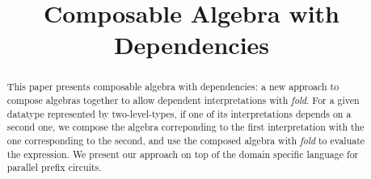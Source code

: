 \documentclass[nocopyrightspace]{sigplanconf}
\begin{document}
\setlength{\pdfpageheight}{\paperheight}
\setlength{\pdfpagewidth}{\paperwidth}






\title{Composable Algebra with Dependencies}

           {}
           {}

\maketitle

\begin{abstract}

This paper presents composable algebra with dependencies: a new approach to compose 
algebras together to allow dependent interpretations with {\em fold}. 
For a given datatype represented by two-level-types\cite{sheard04}, if one of its 
interpretations depends on a second one, we compose the algebra correponding 
to the first interpretation with the one corresponding to the second, and use the 
composed algebra with {\em fold} to evaluate the expression. We present our approach 
on top of the domain specific language for parallel prefix circuits.

\end{abstract}



\end{document}

